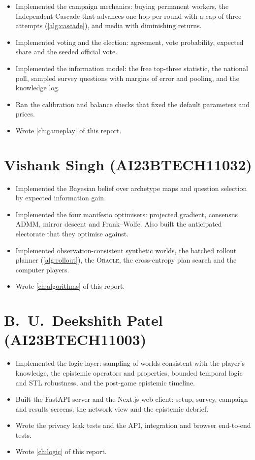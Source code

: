 \documentclass[11pt,a4paper,oneside]{report}
\newcommand{\ORACLE}{\textsc{Oracle}}
\begin{document}
\begin{itemize}
  \item Implemented the campaign mechanics: buying permanent workers, the Independent Cascade that
        advances one hop per round with a cap of three attempts (\cref{alg:cascade}), and media with diminishing returns.
  \item Implemented voting and the election: agreement, vote probability, expected share and the seeded
        official vote.
  \item Implemented the information model: the free top-three statistic, the national poll, sampled survey
        questions with margins of error and pooling, and the knowledge log.
  \item Ran the calibration and balance checks that fixed the default parameters and prices.
  \item Wrote \cref{ch:gameplay} of this report.
\end{itemize}

\section{Vishank Singh (AI23BTECH11032)}

\begin{itemize}
  \item Implemented the Bayesian belief over archetype maps and question selection by expected information
        gain.
  \item Implemented the four manifesto optimisers: projected gradient, consensus ADMM, mirror descent
        and Frank--Wolfe. Also built the anticipated electorate that they optimise against.
  \item Implemented observation-consistent synthetic worlds, the batched rollout planner
        (\cref{alg:rollout}), the \ORACLE, the cross-entropy plan search and the computer players.
  \item Wrote \cref{ch:algorithms} of this report.
\end{itemize}

\section{B.~U.~Deekshith Patel (AI23BTECH11003)}

\begin{itemize}
  \item Implemented the logic layer: sampling of worlds consistent with the player's knowledge, the
        epistemic operators and properties, bounded temporal logic and STL robustness, and the post-game
        epistemic timeline.
  \item Built the FastAPI server and the Next.js web client: setup, survey, campaign and results screens,
        the network view and the epistemic debrief.
  \item Wrote the privacy leak tests and the API, integration and browser end-to-end tests.
  \item Wrote \cref{ch:logic} of this report.
\end{itemize}
\end{document}
